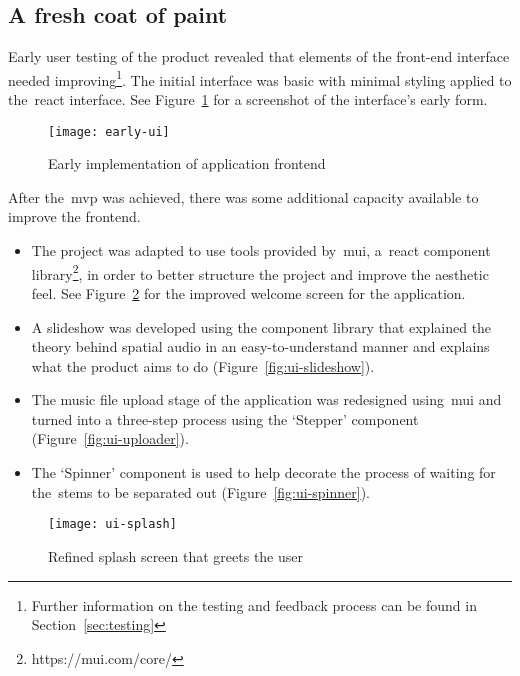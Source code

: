 \subsection{A fresh coat of paint}\label{subsec:a-fresh-coat-of-paint}

Early user testing of the product revealed
that elements of the front-end interface needed improving\footnote{Further information on the testing and feedback process can be found in Section~\ref{sec:testing}}.
The initial interface was basic with minimal styling applied to the~\gls{react} interface.
See Figure~\ref{fig:early-fe} for a screenshot of the interface's early form.

\begin{figure}[!htb]
    \minipage{\textwidth}
    \texttt{[image: early-ui]}
    \caption{Early implementation of application frontend}\label{fig:early-fe}
    \endminipage\hfill
\end{figure}

After the~\gls{mvp} was achieved, there was some additional capacity available to improve the frontend.

\begin{itemize}
    \item The project was adapted to use tools provided by~\gls{mui},
    a~\gls{react} component library\footnote{https://mui.com/core/},
    in order to better structure the project and improve the aesthetic feel.
    See Figure~\ref{fig:ui-splash} for the improved welcome screen for the application.
    \item A slideshow was developed using the component library that explained the theory behind spatial audio in an easy-to-understand manner and explains what the product aims to do (Figure~\ref{fig:ui-slideshow}).
    \item The music file upload stage of the application was redesigned using~\gls{mui} and turned into a three-step process using the `Stepper' component (Figure~\ref{fig:ui-uploader}).
    \item The `Spinner' component is used to help decorate the process of waiting for the~\glspl{stem} to be separated out (Figure~\ref{fig:ui-spinner}).
\end{itemize}

\begin{figure}[!htb]
    \minipage{\textwidth}
    \texttt{[image: ui-splash]}
    \caption{Refined splash screen that greets the user}\label{fig:ui-splash}
    \endminipage\hfill
\end{figure}

